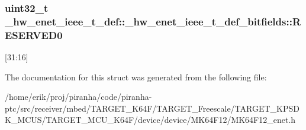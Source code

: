 \subsubsection[{\texorpdfstring{R\+E\+S\+E\+R\+V\+E\+D0}{RESERVED0}}]{\setlength{\rightskip}{0pt plus 5cm}uint32\+\_\+t \+\_\+hw\+\_\+enet\+\_\+ieee\+\_\+t\+\_\+def\+::\+\_\+hw\+\_\+enet\+\_\+ieee\+\_\+t\+\_\+def\+\_\+bitfields\+::\+R\+E\+S\+E\+R\+V\+E\+D0}\hypertarget{struct__hw__enet__ieee__t__def_1_1__hw__enet__ieee__t__def__bitfields_a01a54ef63320132146e4db6982091ed0}{}\label{struct__hw__enet__ieee__t__def_1_1__hw__enet__ieee__t__def__bitfields_a01a54ef63320132146e4db6982091ed0}
\mbox{[}31\+:16\mbox{]} 

The documentation for this struct was generated from the following file\+:\begin{DoxyCompactItemize}
\item 
/home/erik/proj/piranha/code/piranha-\/ptc/src/receiver/mbed/\+T\+A\+R\+G\+E\+T\+\_\+\+K64\+F/\+T\+A\+R\+G\+E\+T\+\_\+\+Freescale/\+T\+A\+R\+G\+E\+T\+\_\+\+K\+P\+S\+D\+K\+\_\+\+M\+C\+U\+S/\+T\+A\+R\+G\+E\+T\+\_\+\+M\+C\+U\+\_\+\+K64\+F/device/device/\+M\+K64\+F12/M\+K64\+F12\+\_\+enet.\+h\end{DoxyCompactItemize}
